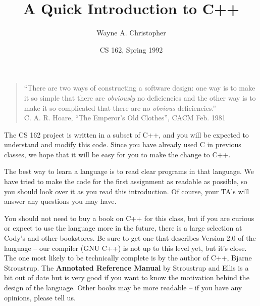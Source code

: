 

\newcommand{\putfig}[3]%
{\begin{figure}%
\centerline{%
\psfig{figure=#1.ps,width=#3}}%
\caption{#2}%
\label{fig:#1}%
\end{figure}}



\title{A Quick Introduction to C++}
\author{Wayne A. Christopher}
\date{CS 162, Spring 1992}



\maketitle

\begin{quote}
``There are two ways of constructing a software design: one way is to
make it so simple that there are {\em obviously} no deficiencies and
the other way is to make it so complicated that there are no {\em
obvious} deficiencies.'' \\ \hbox{} \hfill C. A. R. Hoare, ``The Emperor's
Old Clothes'', CACM Feb. 1981
\end{quote}

The CS 162 project is written in a subset of C++, and you will be
expected to understand and modify this code.  Since you have already
used C in previous classes, we hope that it will be easy for you to
make the change to C++.

The best way to learn a language is to read clear programs in that
language.  We have tried to make the code for the first assignment as
readable as possible, so you should look over it as you read this
introduction.  Of course, your TA's will answer any questions you may
have.

You should not need to buy a book on C++ for this class, but if you
are curious or expect to use the language more in the future, there is
a large selection at Cody's and other bookstores.  Be sure to get one
that describes Version 2.0 of the language -- our compiler (GNU C++)
is not up to this level yet, but it's close.  The one most likely to
be technically complete is by the author of C++, Bjarne Stroustrup.
The {\bf Annotated Reference Manual} by Stroustrup and Ellis is a bit
out of date but is very good if you want to know the motivation behind
the design of the language.  Other books may be more readable -- if
you have any opinions, please tell us.

